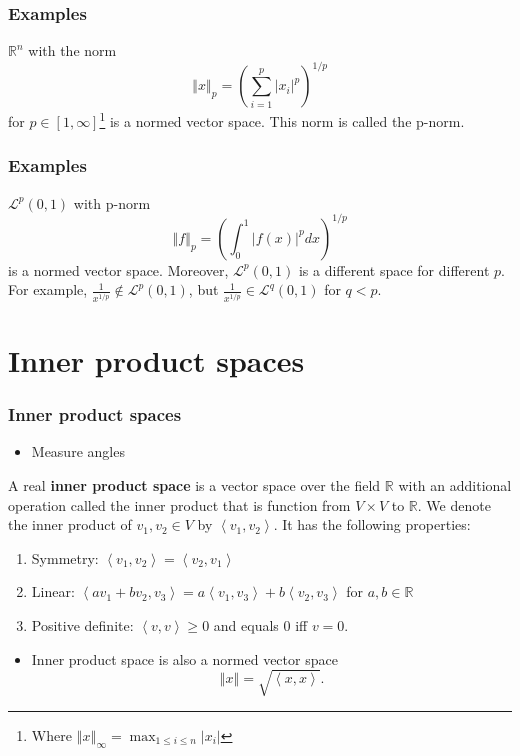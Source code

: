 \documentclass[compress]{beamer}
\def\R{\mathbb{R}}
\newcommand{\iprod}[2]{\left\langle {#1} , {#2} \right\rangle}
\newcommand{\norm}[1]{\left\Vert {#1} \right\Vert}
\begin{document}
\begin{frame}
  \frametitle{Examples}
  \begin{example}
    $\R^n$ with the norm 
    \[ \norm{x}_p = \left( \sum_{i=1}^p |x_i|^p \right)^{1/p} \]
    for $p \in [1,\infty]$\footnote{Where $\norm{x}_\infty = \max_{1\leq
        i \leq n} |x_i| $} is a normed vector space. This norm is called
    the p-norm. 
  \end{example}
\end{frame}  

\begin{frame}
  \frametitle{Examples}
  \begin{example}
    $\mathcal{L}^p(0,1)$ with p-norm 
    \[ \norm{f}_p = \left(\int_0^1 |f(x)|^p dx\right)^{1/p} \] is a
    normed vector space. Moreover, $\mathcal{L}^p(0,1)$ is a different
    space for different $p$. For example, $\frac{1}{x^{1/p}} \not\in
    \mathcal{L}^p(0,1)$, but $\frac{1}{x^{1/p}} \in \mathcal{L}^q(0,1)$
    for $q < p$. 
  \end{example}
\end{frame}

\section{Inner product spaces}
\begin{frame}
  \frametitle{Inner product spaces}
  \begin{itemize}
  \item Measure angles
  \end{itemize}
  \begin{definition}
    A real \textbf{inner product space} is a vector space over the field
    $\R$ with an additional operation called the inner product that is
    function from $V \times V$ to $\mathbb{R}$. We denote the inner
    product of $v_1, v_2 \in V$ by $\iprod{v_1}{v_2}$. It has the
    following properties:
    \begin{enumerate}
    \item Symmetry: $\iprod{v_1}{v_2} = \iprod{v_2}{v_1}$
    \item Linear: $\iprod{a v_1 + b v_2}{v_3} = a \iprod{v_1}{v_3} + b
      \iprod{v_2}{v_3}$ for $a, b \in \R$
    \item Positive definite: $\iprod{v}{v} \geq 0$ and equals $0$ iff
      $v=0$. 
    \end{enumerate} 
  \end{definition}
  \begin{itemize}
  \item Inner product space is also a normed vector space
    \[ \norm{x} = \sqrt{\iprod{x}{x}}. \]
  \end{itemize}
\end{frame}
\end{document}
